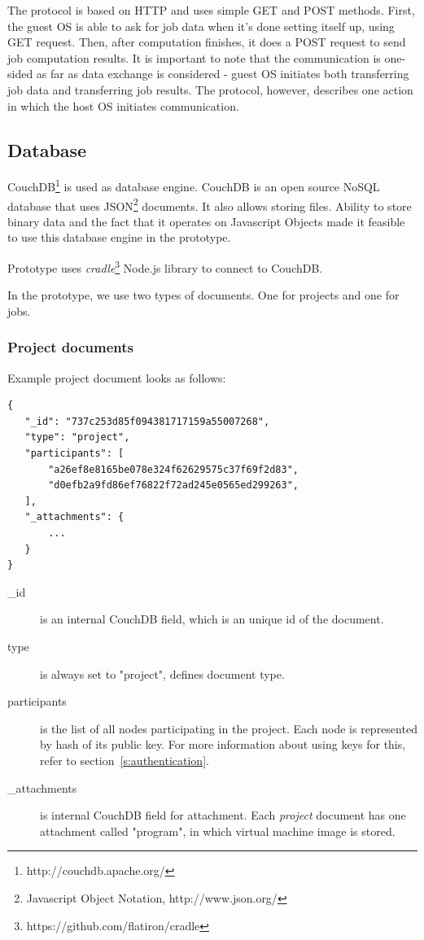 The protocol is based on HTTP and uses simple GET and POST methods. First, the guest OS is able to ask for job data when it's done setting itself up, using GET request. Then, after computation finishes, it does a POST request to send job computation results. It is important to note that the communication is one-sided as far as data exchange is considered - guest OS initiates both transferring job data and transferring job results. The protocol, however, describes one action in which the host OS initiates communication.

\subsection{Database}

CouchDB\footnote{http://couchdb.apache.org/} is used as database engine. CouchDB is an open source NoSQL database that uses JSON\footnote{Javascript Object Notation, http://www.json.org/} documents. It also allows storing files. Ability to store binary data and the fact that it operates on Javascript Objects made it feasible to use this database engine in the prototype.

Prototype uses \emph{cradle}\footnote{https://github.com/flatiron/cradle} Node.js library to connect to CouchDB.

In the prototype, we use two types of documents. One for projects and one for jobs.

\subsubsection{Project documents}

Example project document looks as follows:

\begin{lstlisting}[caption=Project document in JSON format.]
{
   "_id": "737c253d85f094381717159a55007268",
   "type": "project",
   "participants": [
       "a26ef8e8165be078e324f62629575c37f69f2d83",
       "d0efb2a9fd86ef76822f72ad245e0565ed299263",
   ],
   "_attachments": {
       ...
   }
}
\end{lstlisting}

\begin{description}
\item[\_id] is an internal CouchDB field, which is an unique id of the document.
\item[type] is always set to "project", defines document type.
\item[participants] is the list of all nodes participating in the project. Each node is represented by hash of its public key. For more information about using keys for this, refer to section~\ref{s:authentication}.
\item[\_attachments] is internal CouchDB field for attachment. Each \emph{project} document has one attachment called "program", in which virtual machine image is stored.
\end{description}

